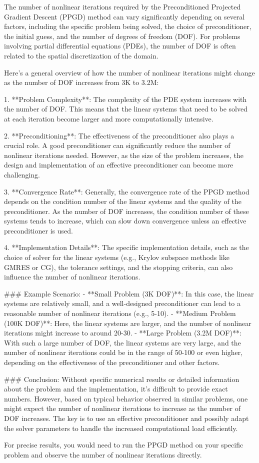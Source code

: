The number of nonlinear iterations required by the Preconditioned Projected Gradient Descent (PPGD) method can vary significantly depending on several factors, including the specific problem being solved, the choice of preconditioner, the initial guess, and the number of degrees of freedom (DOF). For problems involving partial differential equations (PDEs), the number of DOF is often related to the spatial discretization of the domain.

Here's a general overview of how the number of nonlinear iterations might change as the number of DOF increases from 3K to 3.2M:

1. **Problem Complexity**: The complexity of the PDE system increases with the number of DOF. This means that the linear systems that need to be solved at each iteration become larger and more computationally intensive.

2. **Preconditioning**: The effectiveness of the preconditioner also plays a crucial role. A good preconditioner can significantly reduce the number of nonlinear iterations needed. However, as the size of the problem increases, the design and implementation of an effective preconditioner can become more challenging.

3. **Convergence Rate**: Generally, the convergence rate of the PPGD method depends on the condition number of the linear systems and the quality of the preconditioner. As the number of DOF increases, the condition number of these systems tends to increase, which can slow down convergence unless an effective preconditioner is used.

4. **Implementation Details**: The specific implementation details, such as the choice of solver for the linear systems (e.g., Krylov subspace methods like GMRES or CG), the tolerance settings, and the stopping criteria, can also influence the number of nonlinear iterations.

### Example Scenario:
- **Small Problem (3K DOF)**: In this case, the linear systems are relatively small, and a well-designed preconditioner can lead to a reasonable number of nonlinear iterations (e.g., 5-10).
- **Medium Problem (100K DOF)**: Here, the linear systems are larger, and the number of nonlinear iterations might increase to around 20-30.
- **Large Problem (3.2M DOF)**: With such a large number of DOF, the linear systems are very large, and the number of nonlinear iterations could be in the range of 50-100 or even higher, depending on the effectiveness of the preconditioner and other factors.

### Conclusion:
Without specific numerical results or detailed information about the problem and the implementation, it's difficult to provide exact numbers. However, based on typical behavior observed in similar problems, one might expect the number of nonlinear iterations to increase as the number of DOF increases. The key is to use an effective preconditioner and possibly adapt the solver parameters to handle the increased computational load efficiently.

For precise results, you would need to run the PPGD method on your specific problem and observe the number of nonlinear iterations directly.